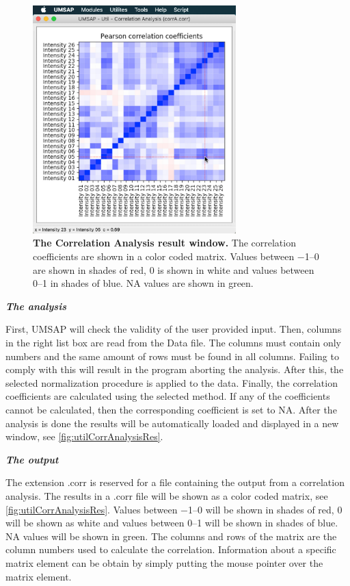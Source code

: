 \begin{figure}[h]
	\centering
	\includegraphics[width=0.7\textwidth]{./IMAGES/UTIL-CORR-WINDOW/util-corr-res.jpg}	    
	\caption[The Correlation Analysis result window]{\textbf{The Correlation Analysis result window.} The correlation coefficients are shown in a color coded matrix. Values between \numrange{-1}{0} are shown in shades of red, \num{0} is shown in white and values between \numrange{0}{1} in shades of blue. NA values are shown in green.}
	\label{fig:utilCorrAnalysisRes}
	\vspace{-5pt} 	
\end{figure} 

\textit{\textbf{The analysis}}

First, UMSAP will check the validity of the user provided input. Then, columns in the right list box are read from the Data file. The columns must contain only numbers and the same amount of rows must be found in all columns. Failing to comply with this will result in the program aborting the analysis. After this, the selected normalization procedure is applied to the data. Finally, the correlation coefficients are calculated using the selected method. If any of the coefficients cannot be calculated, then the corresponding coefficient is set to NA. After the analysis is done the results will be automatically loaded and displayed in a new window, see \autoref{fig:utilCorrAnalysisRes}. 

\textit{\textbf{The output}}

The extension .corr is reserved for a file containing the output from a correlation analysis. The results in a .corr file will be shown as a color coded matrix, see \autoref{fig:utilCorrAnalysisRes}. Values between \numrange{-1}{0} will be shown in shades of red, \num{0} will be shown as white and values between \numrange{0}{1} will be shown in shades of blue. NA values will be shown in green. The columns and rows of the matrix are the column numbers used to calculate the correlation. Information about a specific matrix element can be obtain by simply putting the mouse pointer over the matrix element.  

